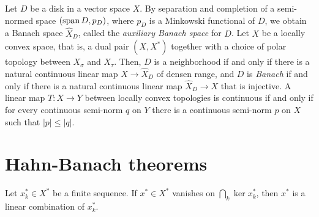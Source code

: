 \documentclass{../../large}
\begin{document}
Let $D$ be a disk in a vector space $X$.
By separation and completion of a semi-normed space $(\operatorname{span} D,p_D)$, where $p_D$ is a Minkowski functional of $D$, we obtain a Banach space $\hat X_D$, called the \emph{auxiliary Banach space} for $D$.
Let $X$ be a locally convex space, that is, a dual pair $(X,X^*)$ together with a choice of polar topology between $X_\sigma$ and $X_\tau$.
Then, $D$ is a neighborhood if and only if there is a natural continuous linear map $X\to\hat X_D$ of densen range, and $D$ is \emph{Banach} if and only if there is a natural continuous linear map $\hat X_D\to X$ that is injective.
A linear map $T:X\to Y$ between locally convex topologies is continuous if and only if for every continuous semi-norm $q$ on $Y$ there is a continuous semi-norm $p$ on $X$ such that $|p|\le|q|$.




\section{Hahn-Banach theorems}


\begin{prb}
Let $x_k^*\in X^*$ be a finite sequence.
If $x^*\in X^*$ vanishes on $\bigcap_k\ker x_k^*$, then $x^*$ is a linear combination of $x_k^*$.
\end{prb}
\end{document}
